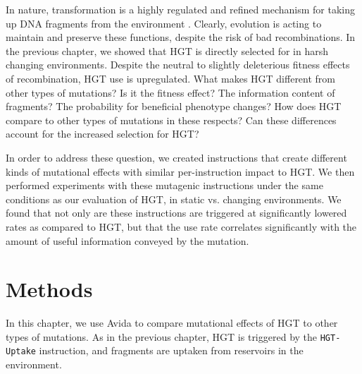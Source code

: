 \documentclass[PhD]{msu-thesis}
\begin{document}
In nature, transformation is a highly regulated and refined mechanism for taking up DNA fragments from the environment \cite{solomon_whos_1996,seitz_cues_2013,fontaine_novel_2010}. 
Clearly, evolution
is acting to maintain and preserve these functions, despite the risk of bad recombinations. In the previous chapter, we showed that HGT is directly selected for in harsh changing environments. Despite the neutral to slightly deleterious fitness effects of recombination, HGT use is upregulated.
What makes HGT different from other types of mutations?
Is it the fitness effect? The information content of fragments? The probability for beneficial phenotype changes? 
How does HGT compare to other types of mutations in these respects?
Can these differences account for the increased selection for HGT? 

In order to address these question, we created instructions that create different kinds of mutational effects with similar per-instruction impact to HGT. We then performed experiments with these mutagenic instructions under the same conditions as our evaluation of HGT, in static vs. changing environments. We found that not only are these instructions are triggered at significantly lowered rates as compared to HGT, but that the use rate correlates significantly with the amount of useful information conveyed by the mutation. 


\section{Methods}
In this chapter, we use Avida to compare mutational effects of HGT to other types of mutations. As in the previous chapter, HGT is triggered by the \texttt{HGT-Uptake} instruction, and fragments are uptaken from reservoirs in the environment. 
\end{document}
